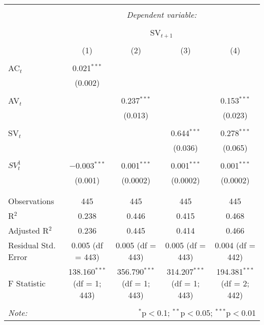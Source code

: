
\begin{table}[!htbp] \centering 
  \caption{} 
  \label{} 
\begin{tabular}{@{\extracolsep{5pt}}lcccc} 
\\[-1.8ex]\hline 
\hline \\[-1.8ex] 
 & \multicolumn{4}{c}{\textit{Dependent variable:}} \\ 
\cline{2-5} 
\\[-1.8ex] & \multicolumn{4}{c}{SV$_{t+1}$} \\ 
\\[-1.8ex] & (1) & (2) & (3) & (4)\\ 
\hline \\[-1.8ex] 
 AC$_{t}$ & 0.021$^{***}$ &  &  &  \\ 
  & (0.002) &  &  &  \\ 
  & & & & \\ 
 AV$_{t}$ &  & 0.237$^{***}$ &  & 0.153$^{***}$ \\ 
  &  & (0.013) &  & (0.023) \\ 
  & & & & \\ 
 SV$_{t}$ &  &  & 0.644$^{***}$ & 0.278$^{***}$ \\ 
  &  &  & (0.036) & (0.065) \\ 
  & & & & \\ 
 $SV^{1}_{t}$ & $-$0.003$^{***}$ & 0.001$^{***}$ & 0.001$^{***}$ & 0.001$^{***}$ \\ 
  & (0.001) & (0.0002) & (0.0002) & (0.0002) \\ 
  & & & & \\ 
\hline \\[-1.8ex] 
Observations & 445 & 445 & 445 & 445 \\ 
R$^{2}$ & 0.238 & 0.446 & 0.415 & 0.468 \\ 
Adjusted R$^{2}$ & 0.236 & 0.445 & 0.414 & 0.466 \\ 
Residual Std. Error & 0.005 (df = 443) & 0.005 (df = 443) & 0.005 (df = 443) & 0.004 (df = 442) \\ 
F Statistic & 138.160$^{***}$ (df = 1; 443) & 356.790$^{***}$ (df = 1; 443) & 314.207$^{***}$ (df = 1; 443) & 194.381$^{***}$ (df = 2; 442) \\ 
\hline 
\hline \\[-1.8ex] 
\textit{Note:}  & \multicolumn{4}{r}{$^{*}$p$<$0.1; $^{**}$p$<$0.05; $^{***}$p$<$0.01} \\ 
\end{tabular} 
\end{table} 
